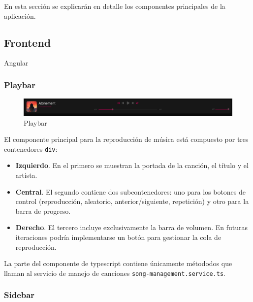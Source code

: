\documentclass[11pt, a4paper]{article}
\begin{document}
En esta sección se explicarán en detalle los componentes principales de la aplicación.

        \subsection{Frontend}

        Angular

            \subsubsection{Playbar}

            \begin{figure}[H]
                \centering
                \includegraphics[width=1\textwidth]{media/screenshots/playbar.png}
                \caption{Playbar}
                \label{fig:playbar}
            \end{figure}

            El componente principal para la reproducción de música está compuesto por tres contenedores \verb|div|:

            \begin{itemize}
                \item \textbf{Izquierdo}. En el primero se muestran la portada de la canción, el título y el artista.
                \item \textbf{Central}. El segundo contiene dos subcontenedores: uno para los botones de control (reproducción, aleatorio, anterior/siguiente, repetición) y otro para la barra de progreso.
                \item \textbf{Derecho}. El tercero incluye exclusivamente la barra de volumen. En futuras iteraciones podría implementarse un botón para gestionar la cola de reproducción.
            \end{itemize}

            La parte del componente de typescript contiene únicamente métododos que llaman al servicio de manejo de canciones \verb|song-management.service.ts|.

            \subsubsection{Sidebar}
\end{document}
